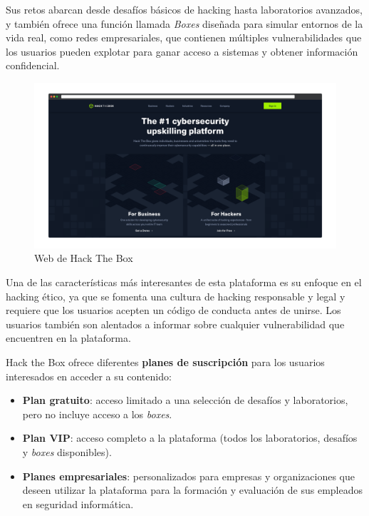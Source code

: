         Sus retos abarcan desde desafíos básicos de hacking hasta laboratorios avanzados, y también ofrece una función llamada \textit{Boxes} diseñada para simular entornos de la vida real, como redes empresariales, que contienen múltiples vulnerabilidades que los usuarios pueden explotar para ganar acceso a sistemas y obtener información confidencial.
        
        \begin{figure}[h]
            \centering

            \includegraphics[width=\textwidth]{images/Capturas/Web de HTB.png}

            \caption{Web de Hack The Box}
            \label{fig:HTB-web}
        \end{figure}
        
        Una de las características más interesantes de esta plataforma es su enfoque en el hacking ético, ya que se fomenta una cultura de hacking responsable y legal y requiere que los usuarios acepten un código de conducta antes de unirse. Los usuarios también son alentados a informar sobre cualquier vulnerabilidad que encuentren en la plataforma.
        
        Hack the Box ofrece diferentes \textbf{planes de suscripción} para los usuarios interesados en acceder a su contenido:
        
        \begin{itemize}
            \item \textbf{Plan gratuito}: acceso limitado a una selección de desafíos y laboratorios, pero no incluye acceso a los \textit{boxes}.
        
            \item \textbf{Plan VIP}: acceso completo a la plataforma (todos los laboratorios, desafíos y \textit{boxes} disponibles).
        
            \item \textbf{Planes empresariales}: personalizados para empresas y organizaciones que deseen utilizar la plataforma para la formación y evaluación de sus empleados en seguridad informática.
        \end{itemize}
        
